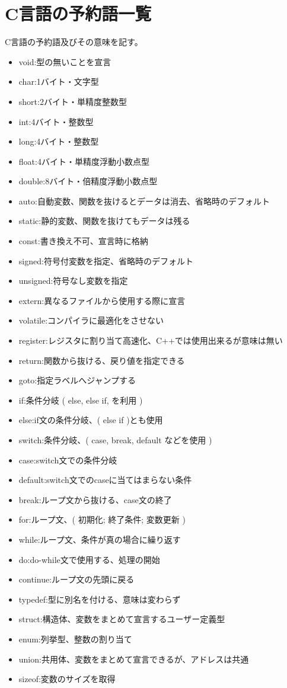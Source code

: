 \section{C言語の予約語一覧}
C言語の予約語及びその意味を記す。
\begin{itemize}
\item void:型の無いことを宣言
\item char:1バイト・文字型
\item short:2バイト・単精度整数型
\item int:4バイト・整数型
\item long:4バイト・整数型
\item float:4バイト・単精度浮動小数点型
\item double:8バイト・倍精度浮動小数点型
\item auto:自動変数、関数を抜けるとデータは消去、省略時のデフォルト
\item static:静的変数、関数を抜けてもデータは残る
\item const:書き換え不可、宣言時に格納
\item signed:符号付変数を指定、省略時のデフォルト
\item unsigned:符号なし変数を指定
\item extern:異なるファイルから使用する際に宣言
\item volatile:コンパイラに最適化をさせない
\item register:レジスタに割り当て高速化、C++では使用出来るが意味は無い
\item return:関数から抜ける、戻り値を指定できる
\item goto:指定ラベルへジャンプする
\item if:条件分岐 ( else, else if, を利用 )
\item else:if文の条件分岐、( else if )とも使用
\item switch:条件分岐、( case, break, default などを使用 )
\item case:switch文での条件分岐
\item default:switch文でのcaseに当てはまらない条件
\item break:ループ文から抜ける、case文の終了
\item for:ループ文、( 初期化; 終了条件; 変数更新 )
\item while:ループ文、条件が真の場合に繰り返す
\item do:do-while文で使用する、処理の開始
\item continue:ループ文の先頭に戻る
\item typedef:型に別名を付ける、意味は変わらず
\item struct:構造体、変数をまとめて宣言するユーザー定義型
\item enum:列挙型、整数の割り当て
\item union:共用体、変数をまとめて宣言できるが、アドレスは共通
\item sizeof:変数のサイズを取得
\end{itemize}


